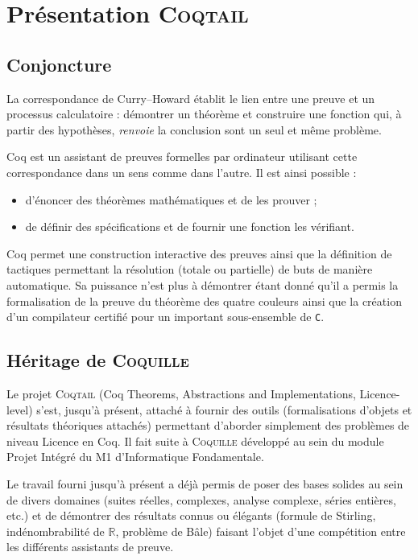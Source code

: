 \documentclass[11pt]{article}
\newcommand{\coqtail}{\textsc{Coqtail}}
\newcommand{\coquille}{\textsc{Coquille}}
\begin{document}
\section{Présentation \coqtail{}}

\subsection{Conjoncture}

La correspondance de Curry--Howard établit le lien entre une preuve et un processus calculatoire : démontrer un théorème et construire une fonction qui, à partir des hypothèses, \emph{renvoie} la conclusion sont un seul et même problème.

Coq\cite{L:BC04} est un assistant de preuves formelles par ordinateur utilisant cette correspondance dans un sens comme dans l'autre. Il est ainsi possible :
\begin{itemize}
  \item d'énoncer des théorèmes mathématiques et de les prouver ;
  \item de définir des spécifications et de fournir une fonction les vérifiant.
\end{itemize}

Coq permet une construction interactive des preuves ainsi que la définition de tactiques permettant la résolution (totale ou partielle) de buts de manière automatique. Sa puissance n'est plus à démontrer étant donné qu'il a permis la formalisation de la preuve du théorème des quatre couleurs\cite{Gonthier07} ainsi que la création d'un compilateur certifié pour un important sous-ensemble de \texttt{C}\cite{compcert}.

\subsection{Héritage de \coquille{}}

Le projet \coqtail{} (Coq Theorems, Abstractions and Implementations, Licence-level) s'est, jusqu'à présent, attaché à fournir des outils (formalisations d'objets et résultats théoriques attachés) permettant d'aborder simplement des problèmes de niveau Licence en Coq. Il fait suite à \coquille{} développé au sein du module Projet Intégré du M1 d'Informatique Fondamentale.

Le travail fourni jusqu'à présent a déjà permis de poser des bases solides au sein de divers domaines (suites réelles, complexes, analyse complexe, séries entières, etc.) et de démontrer des résultats connus ou élégants (formule de Stirling, indénombrabilité de $\mathbb{R}$, problème de Bâle) faisant l'objet d'une compétition entre les différents assistants de preuve\cite{Freek}.
\end{document}
